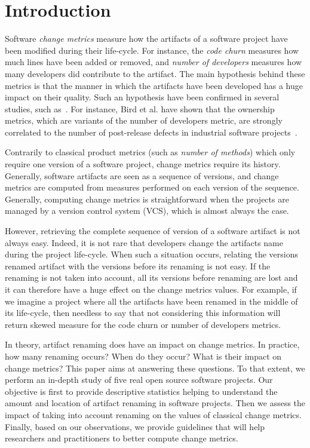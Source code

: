 \section{Introduction}
\label{sec:intro}

Software \emph{change metrics} measure how the artifacts of a software project have been modified during their life-cycle. For instance, the \emph{code churn} measures how much lines have been added or removed, and \emph{number of developers} measures how many developers did contribute to the artifact. The main hypothesis behind these metrics is that the manner in which the artifacts have been developed has a huge impact on their quality. Such an hypothesis have been confirmed in several studies, such as~\cite{graves_predicting_2000,nagappan_use_2005,weyuker_too_2008,moser_comparative_2008,matsumoto_analysis_2010,bird_dont_2011,dambros_evaluating_2012,illes-seifert_exploring_2010,posnett_dual_2013}. For instance, Bird et al. have shown that the ownership metrics, which are variants of the number of developers metric, are strongly correlated to the number of post-release defects in industrial software projects~\cite{bird_dont_2011}.

Contrarily to classical product metrics (such as \emph{number of methods}) which only require one version of a software project, change metrics require its history. Generally, software artifacts are seen as a sequence of versions, and change metrics are computed from measures performed on each version of the sequence. Generally, computing change metrics is straightforward when the projects are managed by a version control system (VCS), which is almost always the case.

However, retrieving the complete sequence of version of a software artifact is not always easy. Indeed, it is not rare that developers change the artifacts name during the project life-cycle. When such a situation occurs, relating the versions renamed artifact with the versions before its renaming is not easy. If the renaming is not taken into account, all its versions before renaming are lost and it can therefore have a huge effect on the change metrics values.  For example, if we imagine a project where all the artifacts have been renamed in the middle of its life-cycle, then needless to say that not considering this information will return skewed measure for the code churn or number of developers metrics. 

In theory, artifact renaming does have an impact on change metrics. In practice, how many renaming occurs? When do they occur? What is their impact on change metrics? This paper aims at answering these questions. To that extent, we perform an in-depth study of five real open source software projects. Our objective is first to provide descriptive statistics helping to understand the amount and location of artifact renaming in software projects. Then we assess the impact of taking into account renaming on the values of classical change metrics. Finally, based on our observations, we provide guidelines that will help researchers and practitioners to better compute change metrics.

